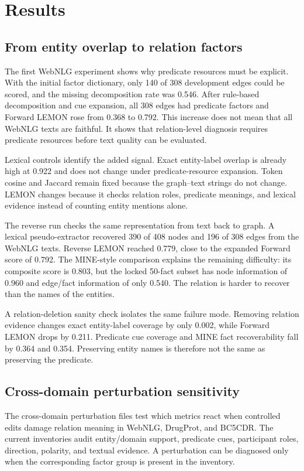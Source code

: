 \section{Results}
\subsection{From entity overlap to relation factors}
The first WebNLG experiment shows why predicate resources must be explicit. With the initial factor dictionary, only 140 of 308 development edges could be scored, and the missing decomposition rate was 0.546. After rule-based decomposition and cue expansion, all 308 edges had predicate factors and Forward LEMON rose from 0.368 to 0.792. This increase does not mean that all WebNLG texts are faithful. It shows that relation-level diagnosis requires predicate resources before text quality can be evaluated.

Lexical controls identify the added signal. Exact entity-label overlap is already high at 0.922 and does not change under predicate-resource expansion. Token cosine and Jaccard remain fixed because the graph--text strings do not change. LEMON changes because it checks relation roles, predicate meanings, and lexical evidence instead of counting entity mentions alone.

The reverse run checks the same representation from text back to graph. A lexical pseudo-extractor recovered 390 of 408 nodes and 196 of 308 edges from the WebNLG texts. Reverse LEMON reached 0.779, close to the expanded Forward score of 0.792. The MINE-style comparison explains the remaining difficulty: its composite score is 0.803, but the locked 50-fact subset has node information of 0.960 and edge/fact information of only 0.540. The relation is harder to recover than the names of the entities.

A relation-deletion sanity check isolates the same failure mode. Removing relation evidence changes exact entity-label coverage by only 0.002, while Forward LEMON drops by 0.211. Predicate cue coverage and MINE fact recoverability fall by 0.364 and 0.354. Preserving entity names is therefore not the same as preserving the predicate.

\subsection{Cross-domain perturbation sensitivity}
The cross-domain perturbation files test which metrics react when controlled edits damage relation meaning in WebNLG, DrugProt, and BC5CDR. The current inventories audit entity/domain support, predicate cues, participant roles, direction, polarity, and textual evidence. A perturbation can be diagnosed only when the corresponding factor group is present in the inventory.


